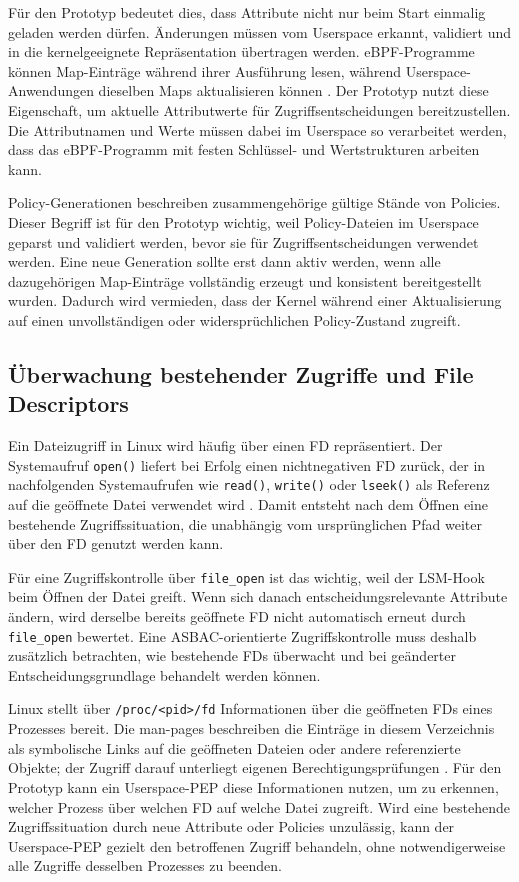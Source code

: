 Für den Prototyp bedeutet dies, dass Attribute nicht nur beim Start einmalig geladen werden dürfen. 
Änderungen müssen vom Userspace erkannt, validiert und in die kernelgeeignete Repräsentation übertragen werden. 
eBPF-Programme können Map-Einträge während ihrer Ausführung lesen, während Userspace-Anwendungen dieselben Maps aktualisieren können \citep{manBpf}.
Der Prototyp nutzt diese Eigenschaft, um aktuelle Attributwerte für Zugriffsentscheidungen bereitzustellen.
Die Attributnamen und Werte müssen dabei im Userspace so verarbeitet werden, dass das eBPF-Programm mit festen Schlüssel- und Wertstrukturen arbeiten kann.

Policy-Generationen beschreiben zusammengehörige gültige Stände von Policies. 
Dieser Begriff ist für den Prototyp wichtig, weil Policy-Dateien im Userspace geparst und validiert werden, bevor sie für Zugriffsentscheidungen verwendet werden. 
Eine neue Generation sollte erst dann aktiv werden, wenn alle dazugehörigen Map-Einträge vollständig erzeugt und konsistent bereitgestellt wurden. 
Dadurch wird vermieden, dass der Kernel während einer Aktualisierung auf einen unvollständigen oder widersprüchlichen Policy-Zustand zugreift.

\subsection{Überwachung bestehender Zugriffe und File Descriptors}\label{sec:fd-monitoring-foundations}
Ein Dateizugriff in Linux wird häufig über einen FD repräsentiert.
Der Systemaufruf \texttt{open()} liefert bei Erfolg einen nichtnegativen FD zurück, der in nachfolgenden Systemaufrufen wie \texttt{read()}, \texttt{write()} oder \texttt{lseek()} als Referenz auf die geöffnete Datei verwendet wird \citep{manOpen}.
Damit entsteht nach dem Öffnen eine bestehende Zugriffssituation, die unabhängig vom ursprünglichen Pfad weiter über den FD genutzt werden kann.

Für eine Zugriffskontrolle über \texttt{file\_open} ist das wichtig, weil der LSM-Hook beim Öffnen der Datei greift. 
Wenn sich danach entscheidungsrelevante Attribute ändern, wird derselbe bereits geöffnete FD nicht automatisch erneut durch \texttt{file\_open} bewertet.
Eine ASBAC-orientierte Zugriffskontrolle muss deshalb zusätzlich betrachten, wie bestehende FDs überwacht und bei geänderter Entscheidungsgrundlage behandelt werden können.

Linux stellt über \texttt{/proc/<pid>/fd} Informationen über die geöffneten FDs eines Prozesses bereit.
Die man-pages beschreiben die Einträge in diesem Verzeichnis als symbolische Links auf die geöffneten Dateien oder andere referenzierte Objekte; der Zugriff darauf unterliegt eigenen Berechtigungsprüfungen \citep{manProcPidFd}. 
Für den Prototyp kann ein Userspace-PEP diese Informationen nutzen, um zu erkennen, welcher Prozess über welchen FD auf welche Datei zugreift.
Wird eine bestehende Zugriffssituation durch neue Attribute oder Policies unzulässig, kann der Userspace-PEP gezielt den betroffenen Zugriff behandeln, ohne notwendigerweise alle Zugriffe desselben Prozesses zu beenden.

